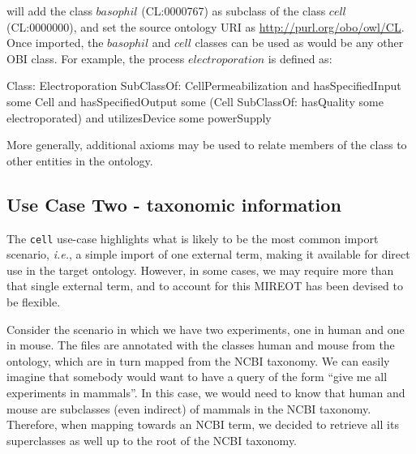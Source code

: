 \documentclass{ao2e}%
\begin{document}
will add the class $basophil$ (CL:0000767) as subclass of the class $cell$  (CL:0000000), and set the source ontology URI as \url{http://purl.org/obo/owl/CL}.
Once imported, the $basophil$ and $cell$ classes can be used as would be any other OBI class. For example, the process $electroporation$ is defined as:

\begin{footnotesize}
\begin{verbatimtab}
Class: Electroporation
    SubClassOf: CellPermeabilization
		        and hasSpecifiedInput some Cell
			and hasSpecifiedOutput some (Cell SubClassOf: hasQuality some electroporated)
			and utilizesDevice some powerSupply	
\end{verbatimtab}
\end{footnotesize}

More generally, additional axioms may be used to relate members of the class to other entities in the ontology.


\subsection*{Use Case Two - taxonomic information}

The \texttt{cell} use-case highlights what is likely to be the most common import scenario, \emph{i.e.}, a simple import of one external term, making it available for direct use in the target ontology.
However, in some cases, we may require more than that single external term, and to account for this \ac{MIREOT} has been devised to be flexible.

Consider the scenario in which we have two experiments, one in human and one in mouse. 
The files are annotated with the classes human and mouse from the ontology, which are in turn mapped from the NCBI taxonomy. 
We can easily imagine that somebody would want to have a query of the form ``give me all 
experiments in mammals''. In this case, we would need to know that human and mouse are 
subclasses (even indirect) of mammals in the NCBI taxonomy. Therefore, when mapping 
towards an NCBI term, we decided to retrieve all its superclasses as well up to the root of the 
NCBI taxonomy.
\end{document}
